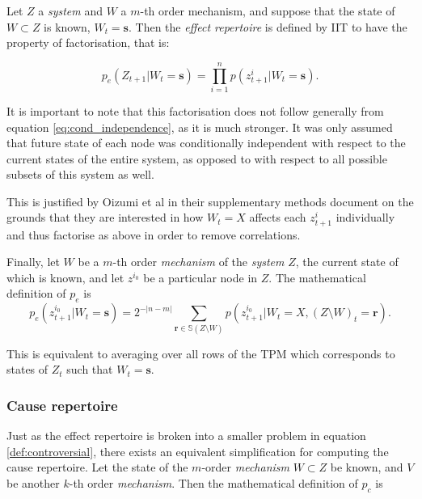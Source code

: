 Let $Z$ a \textit{system} and $W$ a $m$-th order mechanism, and suppose that the state of $W \subset Z$ is known, $W_t = \mathbf{s}$. Then the  \textit{effect repertoire} is defined by IIT \cite{oizumi2014phenomenology} to have the property of factorisation, that is:

\begin{equation}
\label{def:controversial}
p_e(Z_{t+1}|W_t = \mathbf{s}) = \prod \limits_{i= 1}^n p(z^i_{t+1}|W_t = \mathbf{s}).
\end{equation}

It is important to note that this factorisation does not follow generally from equation \ref{eq:cond_independence}, as it is much stronger. It was only assumed that future state of each node was conditionally independent with respect to the current states of the entire system, as opposed to with respect to all possible subsets of this system as well.

This is justified by Oizumi et al \cite{oizumi2014phenomenology} in their supplementary methods document on the grounds that they are interested in how $W_t=X$ affects each $z^i_{t+1}$ individually and thus factorise as above in order to remove correlations.


Finally, let $W$ be a $m$-th order \textit{mechanism} of the \textit{system} $Z$, the current state of which is known, and let $z^{i_0}$ be a particular node in $Z$. The mathematical definition \cite{krohn2016computing} of $p_e$ is
\begin{equation}
\label{def:effect_repertoire}
p_e(z_{t+1}^{i_0}|W_t = \mathbf{s}) = 2^{-|n-m|}\sum \limits_{\mathbf{r} \in \mathbb{S}(Z\setminus W)} p(z_{t+1}^{i_0}|W_t = X, (Z\setminus W)_t = \mathbf{r}).
\end{equation}

This is equivalent to averaging over all rows of the TPM which corresponds to states of $Z_t$ such that $ W_t = \mathbf{s} $.


\subsubsection{Cause repertoire}

Just as the effect repertoire is broken into a smaller problem in equation \ref{def:controversial}, there exists an equivalent simplification for computing the cause repertoire. Let the state of the $m$-order \textit{mechanism} $W \subset Z$ be known, and $V$ be another $k$-th order \textit{mechanism}. Then the mathematical definition \cite{krohn2016computing} of $p_c$ is

